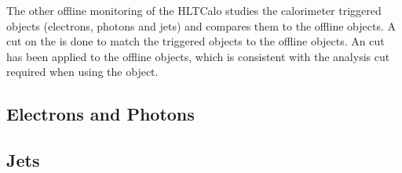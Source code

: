 The other offline monitoring of the HLTCalo studies the calorimeter triggered objects (electrons, photons and jets) and compares them to the offline objects.
A cut on the \dr{} is done to match the triggered objects to the offline objects.
An \et{} cut has been applied to the offline objects, which is consistent with the analysis cut required when using the object. 



\subsection{Electrons and Photons}




 
\subsection{Jets}


